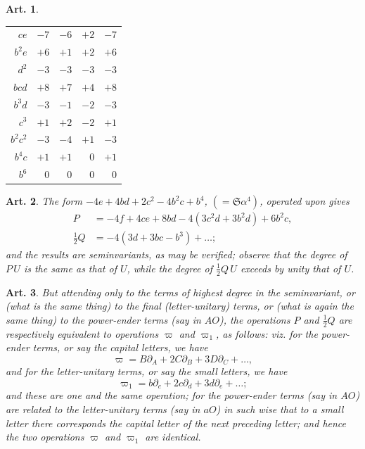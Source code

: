 \documentclass[11pt,a4paper]{article}
\theoremstyle{cayley}
\newtheorem{art}{Art.}[section]
\begin{document}
\begin{art}
\begin{center}
\begin{tabular}{r|rrr|r}
$ce$ & $-7$ & $-6$ & $+2$ & $-7$ \\
$b^{2}e$ & $+6$ & $+1$ & $+2$ & $+6$ \\
$d^{2}$ & $-3$ & $-3$ & $-3$ & $-3$ \\
$bcd$ & $+8$ & $+7$ & $+4$ & $+8$ \\
$b^{3}d$ & $-3$ & $-1$ & $-2$ & $-3$ \\
$c^{3}$ & $+1$ & $+2$ & $-2$ & $+1$ \\
$b^{2}c^{2}$ & $-3$ & $-4$ & $+1$ & $-3$ \\
$b^{4}c$ & $+1$ & $+1$ & $0$ & $+1$ \\
$b^{6}$ & $0$ & $0$ & $0$ & $0$ \\
\end{tabular}
\end{center}
\end{art}

\setcounter{art}{31}
\begin{art}
The form $-4e + 4bd + 2c^{2} - 4b^{2}c + b^{4}$, $(= \mathfrak{S}\alpha^{4})$, operated upon gives
\begin{align*}
P &= -4f + 4ce + 8bd - 4(3c^{2}d + 3b^{2}d) + 6b^{2}c,\\
\tfrac{1}{2}Q &= -4(3d + 3bc - b^{3}) + \ldots;
\end{align*}
and the results are seminvariants, as may be verified; observe that the degree of $P\,U$ is the same as that of $U$, while the degree of $\frac{1}{2}Q\,U$ exceeds by unity that of $U$.
\end{art}

\setcounter{art}{32}
\begin{art}
But attending only to the terms of highest degree in the seminvariant, or (what is the same thing) to the final (letter-unitary) terms, or (what is again the same thing) to the power-ender terms (say in $AO$), the operations $P$ and $\frac{1}{2}Q$ are respectively equivalent to operations $\varpi$ and $\varpi_{1}$, as follows: viz. for the power-ender terms, or say the capital letters, we have
\[
\varpi = B\partial_{A} + 2C\partial_{B} + 3D\partial_{C} + \ldots,
\]
and for the letter-unitary terms, or say the small letters, we have
\[
\varpi_{1} = b\partial_{c} + 2c\partial_{d} + 3d\partial_{e} + \ldots;
\]
and these are one and the same operation; for the power-ender terms (say in $AO$) are related to the letter-unitary terms (say in $aO$) in such wise that to a small letter there corresponds the capital letter of the next preceding letter; and hence the two operations $\varpi$ and $\varpi_{1}$ are identical.
\end{art}
\end{document}

